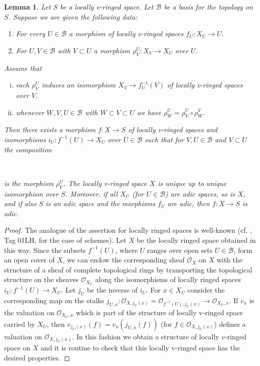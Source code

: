\documentclass[12pt,twoside,a4paper]{article}
\newtheorem{lemma}[thm]{Lemma}
\theoremstyle{definition}
\theoremstyle{remark}
\begin{document}
\begin{lemma}\label{Relative gluing}Let $S$ be a locally v-ringed space. Let $\mathcal{B}$ be a basis for the topology on $S$. Suppose we are given the following data: \begin{enumerate}[(1)] \item For every $U \in\mathcal{B}$ a morphism of locally v-ringed spaces $f_{U}: X_{U} \to U$. \item For $U, V \in \mathcal{B}$ with $V\subset U$ a morphism $\rho_{V}^{U}: X_{V} \to X_{U}$ over $U$. \end{enumerate}Assume that \begin{enumerate}[(i)]\item each $\rho_{V}^{U}$ induces an isomorphism $X_{V} \to f_{U}^{-1}(V)$ of locally v-ringed spaces over $V$. \item whenever $W, V, U \in \mathcal{B}$ with $W \subset V \subset U$ we have $\rho_{W}^{U} = \rho_{V}^{U}\circ \rho_{W}^{V}$. \end{enumerate}Then there exists a morphism $f: X \to S$ of locally v-ringed spaces and isomorphisms $i_{U}: f^{-1}(U) \to X_{U}$ over $U \in \mathcal{B}$ such that for $V, U \in \mathcal{B}$ and $V \subset U$ the composition \begin{center}  \end{center}is the morphism $\rho_{V}^{U}$. The locally v-ringed space $X$ is unique up to unique isomorphism over $S$. Moreover, if all $X_{U}$ (for $U \in \mathcal{B}$) are adic spaces, so is $X$, and if also $S$ is an adic space and the morphisms $f_{U}$ are adic, then $f: X\to S$ is adic.\end{lemma}\begin{proof}The analogue of the assertion for locally ringed spaces is well-known (cf. \cite{Stacks}, Tag 01LH, for the case of schemes). Let $X$ be the locally ringed space obtained in this way. Since the subsets $f^{-1}(U)$, where $U$ ranges over open sets $U \in \mathcal{B}$, form an open cover of $X$, we can endow the corresponding sheaf $\mathcal{O}_{X}$ on $X$ with the structure of a sheaf of complete topological rings by transporting the topological structure on the sheaves $\mathcal{O}_{X_{U}}$ along the isomorphisms of locally ringed spaces $i_{U}: f^{-1}(U) \to X_{U}$. Let $j_{U}$ be the inverse of $i_{U}$. For $x \in X_{U}$ consider the corresponding map on the stalks $j_{U, x}: \mathcal{O}_{X, j_{U}(x)} = \mathcal{O}_{f^{-1}(U), j_{U}(x)} \to \mathcal{O}_{X_{U}, x}$. If $v_{x}$ is the valuation on $\mathcal{O}_{X_{U}, x}$ which is part of the structure of locally v-ringed space carried by $X_{U}$, then $v_{j_{U}(x)}(f) = v_{x}(j_{U, x}(f))$ (for $f \in \mathcal{O}_{X, j_{U}(x)}$) defines a valuation on $\mathcal{O}_{X, j_{U}(x)}$. In this fashion we obtain a structure of locally $v$-ringed space on $X$ and it is routine to check that this locally v-ringed space has the desired properties.\end{proof}          
\end{document}
